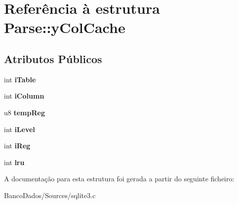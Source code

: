 \hypertarget{struct_parse_1_1y_col_cache}{\section{Referência à estrutura Parse\-:\-:y\-Col\-Cache}
\label{struct_parse_1_1y_col_cache}
}
\subsection*{Atributos Públicos}
\begin{DoxyCompactItemize}
\item 
\hypertarget{struct_parse_1_1y_col_cache_a7d99a4e00555cb0ff7fb3990bb7b549e}{int {\bfseries i\-Table}}\label{struct_parse_1_1y_col_cache_a7d99a4e00555cb0ff7fb3990bb7b549e}

\item 
\hypertarget{struct_parse_1_1y_col_cache_a67bdb189ef88aca5fc30b551da9a0f90}{int {\bfseries i\-Column}}\label{struct_parse_1_1y_col_cache_a67bdb189ef88aca5fc30b551da9a0f90}

\item 
\hypertarget{struct_parse_1_1y_col_cache_a61561cab1ce2e1914083777ae84c8fe8}{u8 {\bfseries temp\-Reg}}\label{struct_parse_1_1y_col_cache_a61561cab1ce2e1914083777ae84c8fe8}

\item 
\hypertarget{struct_parse_1_1y_col_cache_a656ea77cf538db00249221de58fd9066}{int {\bfseries i\-Level}}\label{struct_parse_1_1y_col_cache_a656ea77cf538db00249221de58fd9066}

\item 
\hypertarget{struct_parse_1_1y_col_cache_aadb47e545234142bd1e9ca4803953ab0}{int {\bfseries i\-Reg}}\label{struct_parse_1_1y_col_cache_aadb47e545234142bd1e9ca4803953ab0}

\item 
\hypertarget{struct_parse_1_1y_col_cache_ac163bb2b692f3037054f92294322f999}{int {\bfseries lru}}\label{struct_parse_1_1y_col_cache_ac163bb2b692f3037054f92294322f999}

\end{DoxyCompactItemize}


A documentação para esta estrutura foi gerada a partir do seguinte ficheiro\-:\begin{DoxyCompactItemize}
\item 
Banco\-Dados/\-Sources/sqlite3.\-c\end{DoxyCompactItemize}
